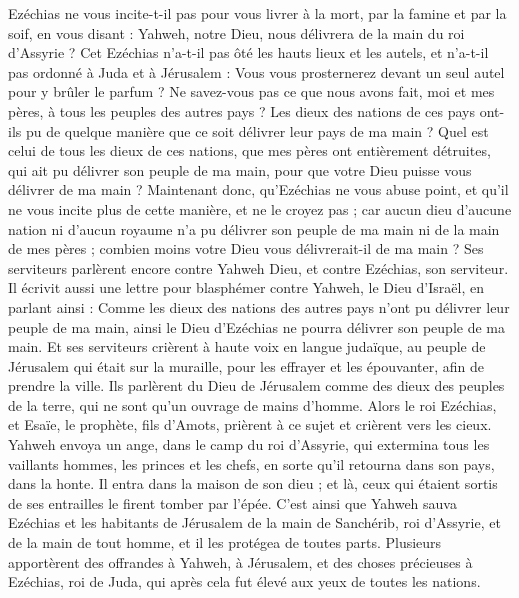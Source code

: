 \begin{multicols}{2}
Ezéchias ne vous incite-t-il pas pour vous livrer à la mort, par la famine et par la soif, en vous disant : Yahweh, notre Dieu, nous délivrera de la main du roi d'Assyrie ?
Cet Ezéchias n'a-t-il pas ôté les hauts lieux et les autels, et n'a-t-il pas ordonné à Juda et à Jérusalem : Vous vous prosternerez devant un seul autel pour y brûler le parfum ?
Ne savez-vous pas ce que nous avons fait, moi et mes pères, à tous les peuples des autres pays ? Les dieux des nations de ces pays ont-ils pu de quelque manière que ce soit délivrer leur pays de ma main ?
Quel est celui de tous les dieux de ces nations, que mes pères ont entièrement détruites, qui ait pu délivrer son peuple de ma main, pour que votre Dieu puisse vous délivrer de ma main ?
Maintenant donc, qu'Ezéchias ne vous abuse point, et qu'il ne vous incite plus de cette manière, et ne le croyez pas ; car aucun dieu d'aucune nation ni d'aucun royaume n'a pu délivrer son peuple de ma main ni de la main de mes pères ; combien moins votre Dieu vous délivrerait-il de ma main ?
Ses serviteurs parlèrent encore contre Yahweh Dieu, et contre Ezéchias, son serviteur.
Il écrivit aussi une lettre pour blasphémer contre Yahweh, le Dieu d'Israël, en parlant ainsi : Comme les dieux des nations des autres pays n'ont pu délivrer leur peuple de ma main, ainsi le Dieu d'Ezéchias ne pourra délivrer son peuple de ma main.
Et ses serviteurs crièrent à haute voix en langue judaïque, au peuple de Jérusalem qui était sur la muraille, pour les effrayer et les épouvanter, afin de prendre la ville.
Ils parlèrent du Dieu de Jérusalem comme des dieux des peuples de la terre, qui ne sont qu'un ouvrage de mains d'homme.
Alors le roi Ezéchias, et Esaïe, le prophète, fils d'Amots, prièrent à ce sujet et crièrent vers les cieux.
Yahweh envoya un ange, dans le camp du roi d'Assyrie, qui extermina tous les vaillants hommes, les princes et les chefs, en sorte qu'il retourna dans son pays, dans la honte. Il entra dans la maison de son dieu ; et là, ceux qui étaient sortis de ses entrailles le firent tomber par l'épée.
C'est ainsi que Yahweh sauva Ezéchias et les habitants de Jérusalem de la main de Sanchérib, roi d'Assyrie, et de la main de tout homme, et il les protégea de toutes parts.
Plusieurs apportèrent des offrandes à Yahweh, à Jérusalem, et des choses précieuses à Ezéchias, roi de Juda, qui après cela fut élevé aux yeux de toutes les nations.

\end{multicols}
